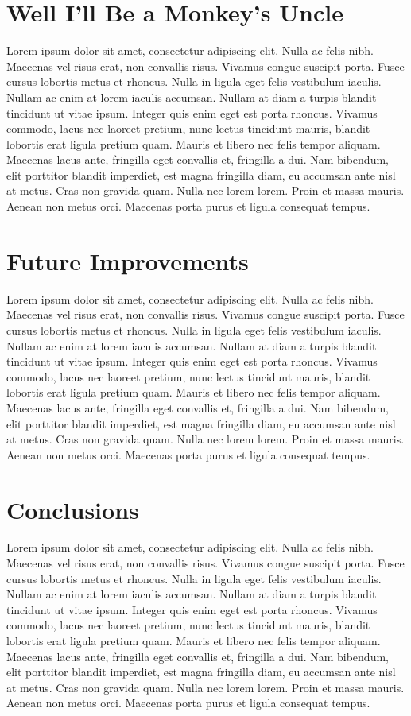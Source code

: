 \documentclass[12pt]{article}
\begin{document}
  \section{Well I'll Be a Monkey's Uncle}
    Lorem ipsum dolor sit amet, consectetur adipiscing elit. Nulla ac felis nibh. Maecenas vel risus erat, non convallis risus. Vivamus congue suscipit porta. Fusce cursus lobortis metus et rhoncus. Nulla in ligula eget felis vestibulum iaculis. Nullam ac enim at lorem iaculis accumsan. Nullam at diam a turpis blandit tincidunt ut vitae ipsum. Integer quis enim eget est porta rhoncus. Vivamus commodo, lacus nec laoreet pretium, nunc lectus tincidunt mauris, blandit lobortis erat ligula pretium quam. Mauris et libero nec felis tempor aliquam. Maecenas lacus ante, fringilla eget convallis et, fringilla a dui. Nam bibendum, elit porttitor blandit imperdiet, est magna fringilla diam, eu accumsan ante nisl at metus. Cras non gravida quam. Nulla nec lorem lorem. Proin et massa mauris. Aenean non metus orci. Maecenas porta purus et ligula consequat tempus.

  \section{Future Improvements}
    Lorem ipsum dolor sit amet, consectetur adipiscing elit. Nulla ac felis nibh. Maecenas vel risus erat, non convallis risus. Vivamus congue suscipit porta. Fusce cursus lobortis metus et rhoncus. Nulla in ligula eget felis vestibulum iaculis. Nullam ac enim at lorem iaculis accumsan. Nullam at diam a turpis blandit tincidunt ut vitae ipsum. Integer quis enim eget est porta rhoncus. Vivamus commodo, lacus nec laoreet pretium, nunc lectus tincidunt mauris, blandit lobortis erat ligula pretium quam. Mauris et libero nec felis tempor aliquam. Maecenas lacus ante, fringilla eget convallis et, fringilla a dui. Nam bibendum, elit porttitor blandit imperdiet, est magna fringilla diam, eu accumsan ante nisl at metus. Cras non gravida quam. Nulla nec lorem lorem. Proin et massa mauris. Aenean non metus orci. Maecenas porta purus et ligula consequat tempus.

  \section{Conclusions}
    Lorem ipsum dolor sit amet, consectetur adipiscing elit. Nulla ac felis nibh. Maecenas vel risus erat, non convallis risus. Vivamus congue suscipit porta. Fusce cursus lobortis metus et rhoncus. Nulla in ligula eget felis vestibulum iaculis. Nullam ac enim at lorem iaculis accumsan. Nullam at diam a turpis blandit tincidunt ut vitae ipsum. Integer quis enim eget est porta rhoncus. Vivamus commodo, lacus nec laoreet pretium, nunc lectus tincidunt mauris, blandit lobortis erat ligula pretium quam. Mauris et libero nec felis tempor aliquam. Maecenas lacus ante, fringilla eget convallis et, fringilla a dui. Nam bibendum, elit porttitor blandit imperdiet, est magna fringilla diam, eu accumsan ante nisl at metus. Cras non gravida quam. Nulla nec lorem lorem. Proin et massa mauris. Aenean non metus orci. Maecenas porta purus et ligula consequat tempus.
\end{document}
